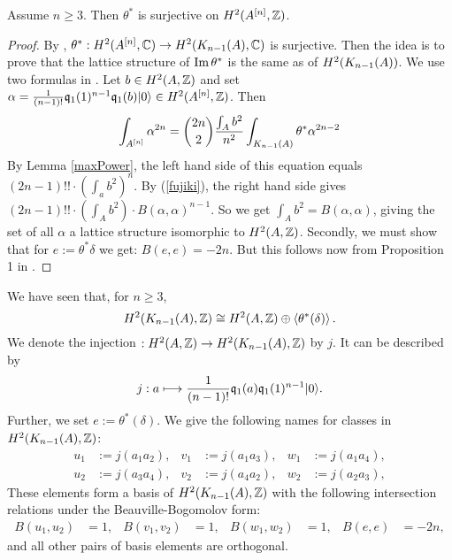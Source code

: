 \begin{proposition}\label{H2Sur} Assume $n\geq 3$. Then
$\theta^*$ is surjective on $H^2(A\hilb{n},\Z)$.
\end{proposition}
\begin{proof}
By \cite[Sect.~7]{Beauville}, $\theta^{\ast} : H^2(A\hilb{n},\C) \rightarrow H^2(\kum{A}{n-1},\C)$ is surjective. 
Then the idea is to prove that the lattice structure of $\im \theta^*$ is the same as of $H^2(\kum{A}{n-1})$.
We use two formulas in \cite[pp.~8--11]{Britze}. Let $b\in H^2(A,\Z)$ and set $\alpha = \frac{1}{(n-1)!}\kq_{1}(1)^{n-1}\kq_1(b)\vac\in H^2(A\hilb{n},\Z)$. Then  
\begin{equation} 
\int_{A\hilb{n}}\alpha^{2n} = \binom{2n}{2} \frac{\int_A b^2}{n^2} \int_{\kum{A}{n-1}} \theta^* \alpha^{2n-2}
\end{equation}
By Lemma \ref{maxPower}, the left hand side of this equation equals $(2n-1)!!\cdot \left(\int_a b^2\right)^n$. By (\ref{fujiki}), the right hand side gives $(2n-1)!! \cdot \left(\int_A b^2\right) \cdot B(\alpha,\alpha)^{n-1}$. So
we get
$\int_A b^2 = B(\alpha,\alpha)$, giving the set of all $\alpha$ a lattice structure isomorphic to $H^2(A,\Z)$. 
Secondly, we must show that for $e:=\theta^*\delta$ we get: $B(e,e) = -2n$. But this follows now from Proposition 1 in \cite{Britze}.
\end{proof}
\begin{notation}\label{BasisH2KA}
 We have seen that, for $n\geq 3$,
 $$
 H^2(\kum{A}{n-1},\Z) \cong H^2(A,\Z) \oplus\left<\theta^*(\delta)\right>.
 $$
We denote the injection $ : H^2(A,\Z) \rightarrow H^2(\kum{A}{n-1},\Z)$ by $j$. It can be described by 
$$
j : a \longmapsto \frac{1}{(n-1)!}\q_1(a)\q_1(1)^{n-1}\vac.
$$ 
Further, we set $e:=\theta^*(\delta)$. We give the following names for classes in $H^2(\kum{A}{n-1},\Z)$:
\begin{align*}
u_1 &:= j(a_1 a_2), & v_1 &:= j(a_1 a_3), & w_1 &:= j(a_1 a_4), \\ 
u_2 &:= j(a_3 a_4), & v_2 &:= j(a_4 a_2), & w_2 &:= j(a_2 a_3),
\end{align*}
These elements form a basis of $H^2(\kum{A}{n-1},\Z)$ with the following intersection relations under the Beauville-Bogomolov form:
\begin{align*}
B(u_1,u_2) &= 1, & B(v_1,v_2) &= 1, & B(w_1,w_2) &= 1,  &
B(e,e)&= -2n,
\end{align*}
and all other pairs of basis elements are orthogonal.
\end{notation}

